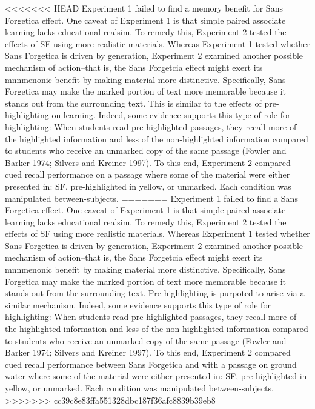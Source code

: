 \documentclass[pdf]{apa6}
\begin{document}
<<<<<<< HEAD
Experiment 1 failed to find a memory benefit for Sans Forgetica effect. One caveat of Experiment 1 is that simple paired associate learning lacks educational realsim. To remedy this, Experiment 2 tested the effects of SF using more realistic materials. Whereas Experiment 1 tested whether Sans Forgetica is driven by generation, Experiment 2 examined another possible mechanism of action--that is, the Sans Forgetcia effect might exert its mnnmenonic benefit by making material more distinctive. Specifically, Sans Forgetica may make the marked portion of text more memorable because it stands out from the surrounding text. This is similar to the effects of pre-highlighting on learning. Indeed, some evidence supports this type of role for highlighting: When students read pre-highlighted passages, they recall more of the highlighted information and less of the non-highlighted information compared to students who receive an unmarked copy of the same passage (Fowler and Barker 1974; Silvers and Kreiner 1997). To this end, Experiment 2 compared cued recall performance on a passage where some of the material were either presented in: SF, pre-highlighted in yellow, or unmarked. Each condition was manipulated between-subjects.
=======
Experiment 1 failed to find a Sans Forgetica effect. One caveat of Experiment 1 is that simple paired associate learning lacks educational realsim. To remedy this, Experiment 2 tested the effects of SF using more realistic materials. Whereas Experiment 1 tested whether Sans Forgetica is driven by generation, Experiment 2 examined another possible mechanism of action--that is, the Sans Forgetcia effect might exert its mnnmenonic benefit by making material more distinctive. Specifically, Sans Forgetica may make the marked portion of text more memorable because it stands out from the surrounding text. Pre-highlighting is purpoted to arise via a similar mechanism. Indeed, some evidence supports this type of role for highlighting: When students read pre-highlighted passages, they recall more of the highlighted information and less of the non-highlighted information compared to students who receive an unmarked copy of the same passage (Fowler and Barker 1974; Silvers and Kreiner 1997). To this end, Experiment 2 compared cued recall performance between Sans Forgetica and with a passage on ground water where some of the material were either presented in: SF, pre-highlighted in yellow, or unmarked. Each condition was manipulated between-subjects.
>>>>>>> cc39c8e83ffa551328dbc187f36afc8839b39eb8
\end{document}
